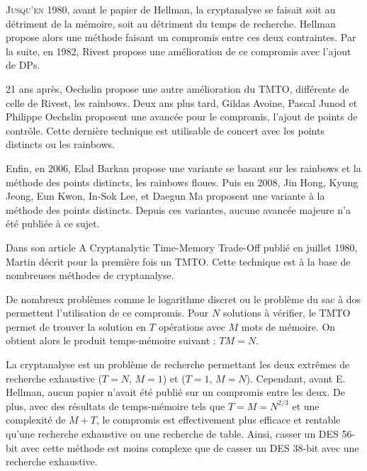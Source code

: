 

		\lettrine{J}{usqu'en 1980}, avant le papier de Hellman\cite{ehellman}, la cryptanalyse se faisait soit au détriment de la mémoire, soit au détriment du temps de recherche. Hellman propose alors une méthode faisant un compromis entre ces deux contraintes. Par la suite, en 1982, Rivest\cite{Rivest} propose une amélioration de ce compromis avec l'ajout de \glspl{DP}.

		\bigskip

		21 ans après, Oechslin\cite{Oech03} propose une autre amélioration du \gls{TMTO}, différente de celle de Rivest, les \glspl{rainbow}. Deux ans plus tard, Gildas Avoine, Pascal Junod et Philippe Oechslin\cite{checkpoints} proposent une avancée pour le compromis, l'ajout de points de contrôle. Cette dernière technique est utilisable de concert avec les points distincts ou les \glspl{rainbow}.

		\bigskip

		Enfin, en 2006, Elad Barkan propose une variante se basant sur les \glspl{rainbow} et la méthode des points distincts\cite{fuzzy}, les \glspl{rainbow} floues. Puis en 2008, Jin Hong, Kyung Jeong, Eun Kwon, In-Sok Lee, et Daegun Ma proposent une variante à la méthode des points distincts. Depuis ces variantes, aucune avancée majeure n'a été publiée à ce sujet.


		Dans son article \og{}A Cryptanalytic Time-Memory Trade-Off\fg{}\cite{ehellman} publié en juillet 1980, Martin  décrit pour la première fois un \gls{TMTO}. Cette technique est à la base de nombreuses méthodes de cryptanalyse.

		\bigskip

		De nombreux problèmes comme le logarithme discret ou le problème du sac à dos permettent l'utilisation de ce compromis. Pour $N$ solutions à vérifier, le \gls{TMTO} permet de trouver la solution en $T$ opérations avec $M$ mots de mémoire. On obtient alors le produit temps-mémoire suivant : $TM = N$.

		\bigskip

		La cryptanalyse est un problème de recherche permettant les deux extrêmes de recherche exhaustive ($T=N$, $M=1$) et ($T=1$, $M=N$). Cependant, avant E. Hellman\cite{ehellman}, aucun papier n'avait été publié sur un compromis entre les deux. De plus, avec des résultats de temps-mémoire tels que $T = M = N^{2/3}$ et une complexité de $M + T$, le compromis est effectivement plus efficace et rentable qu'une recherche exhaustive ou une recherche de table. Ainsi, casser un DES 56-bit avec cette méthode est moins complexe que de casser un DES 38-bit avec une recherche exhaustive.

